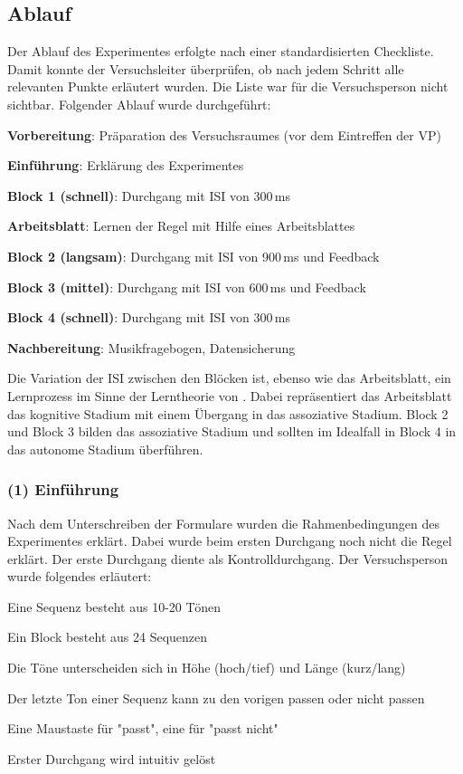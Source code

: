 \documentclass[doc,a4paper,12pt]{apa6}
\begin{document}
\subsection{Ablauf}

Der Ablauf des Experimentes erfolgte nach einer standardisierten Checkliste. Damit konnte der Versuchsleiter überprüfen, ob nach jedem Schritt alle relevanten Punkte erläutert wurden. Die Liste war für die Versuchsperson nicht sichtbar. Folgender Ablauf wurde durchgeführt:

\begin{compactenum}
  \setcounter{enumi}{-1}
  \item \textbf{Vorbereitung}: Präparation des Versuchsraumes (vor dem Eintreffen der VP)
  \item \textbf{Einführung}: Erklärung des Experimentes
  \item \textbf{Block 1 (schnell)}: Durchgang mit ISI von 300\,ms
  \item \textbf{Arbeitsblatt}: Lernen der Regel mit Hilfe eines Arbeitsblattes
  \item \textbf{Block 2 (langsam)}: Durchgang mit ISI von 900\,ms und Feedback
  \item \textbf{Block 3 (mittel)}: Durchgang mit ISI von 600\,ms und Feedback
  \item \textbf{Block 4 (schnell)}: Durchgang mit ISI von 300\,ms
  \item \textbf{Nachbereitung}: Musikfragebogen, Datensicherung
\end{compactenum}

Die Variation der ISI zwischen den Blöcken ist, ebenso wie das Arbeitsblatt, ein Lernprozess im Sinne der Lerntheorie von \textcite{fitts1967human}. Dabei repräsentiert das Arbeitsblatt das kognitive Stadium mit einem Übergang in das assoziative Stadium. Block 2 und Block 3 bilden das assoziative Stadium und sollten im Idealfall in Block 4 in das autonome Stadium überführen.

\subsubsection{(1) Einführung}

Nach dem Unterschreiben der Formulare wurden die Rahmenbedingungen des Experimentes erklärt. Dabei wurde beim ersten Durchgang noch nicht die Regel erklärt. Der erste Durchgang diente als Kontrolldurchgang. Der Versuchsperson wurde folgendes erläutert:

\begin{compactitem}
\item Eine Sequenz besteht aus 10-20 Tönen
\item Ein Block besteht aus 24 Sequenzen
\item Die Töne unterscheiden sich in Höhe (hoch/tief) und Länge (kurz/lang)
\item Der letzte Ton einer Sequenz kann zu den vorigen passen oder nicht passen
\item Eine Maustaste für "passt", eine für "passt nicht"
\item Erster Durchgang wird intuitiv gelöst
\end{compactitem}
\end{document}
